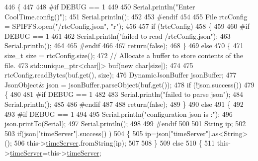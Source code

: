 \begin{DoxyCode}
446 \{
447 
448 \textcolor{preprocessor}{#if DEBUG == 1 }
449 
450     Serial.println(\textcolor{stringliteral}{"Enter CoolTime.config()"});
451     Serial.println();
452 
453 \textcolor{preprocessor}{#endif }
454 
455     File rtcConfig = SPIFFS.open(\textcolor{stringliteral}{"/rtcConfig.json"}, \textcolor{stringliteral}{"r"});
456 
457     \textcolor{keywordflow}{if} (!rtcConfig) 
458     \{
459     
460 \textcolor{preprocessor}{    #if DEBUG == 1 }
461 
462         Serial.println(\textcolor{stringliteral}{"failed to read /rtcConfig.json"});
463         Serial.println();
464     
465 \textcolor{preprocessor}{    #endif}
466 
467         \textcolor{keywordflow}{return}(\textcolor{keyword}{false});
468     \}
469     \textcolor{keywordflow}{else}
470     \{
471         \textcolor{keywordtype}{size\_t} size = rtcConfig.size();
472         \textcolor{comment}{// Allocate a buffer to store contents of the file.}
473         std::unique\_ptr<char[]> buf(\textcolor{keyword}{new} \textcolor{keywordtype}{char}[size]);
474 
475         rtcConfig.readBytes(buf.get(), size);
476         DynamicJsonBuffer jsonBuffer;
477         JsonObject& json = jsonBuffer.parseObject(buf.get());
478         \textcolor{keywordflow}{if} (!json.success()) 
479         \{
480         
481 \textcolor{preprocessor}{        #if DEBUG == 1 }
482 
483             Serial.println(\textcolor{stringliteral}{"failed to parse json"});
484             Serial.println();
485         
486 \textcolor{preprocessor}{        #endif }
487 
488             \textcolor{keywordflow}{return}(\textcolor{keyword}{false});
489         \} 
490         \textcolor{keywordflow}{else}
491         \{  
492         
493 \textcolor{preprocessor}{        #if DEBUG == 1 }
494 
495             Serial.println(\textcolor{stringliteral}{"configuration json is :"});
496             json.printTo(Serial);
497             Serial.println();
498 
499 \textcolor{preprocessor}{        #endif}
500 
501             String ip;
502             
503             \textcolor{keywordflow}{if}(json[\textcolor{stringliteral}{"timeServer"}].success() )
504             \{           
505                  ip=json[\textcolor{stringliteral}{"timeServer"}].as<String>();
506                 this->\hyperlink{classCoolTime_ad2b9858f399108cb440dd1e908916f04}{timeServer}.fromString(ip);
507                 
508             \}
509             \textcolor{keywordflow}{else}
510             \{
511                 this->\hyperlink{classCoolTime_ad2b9858f399108cb440dd1e908916f04}{timeServer}=this->\hyperlink{classCoolTime_ad2b9858f399108cb440dd1e908916f04}{timeServer};

\end{DoxyCode}
